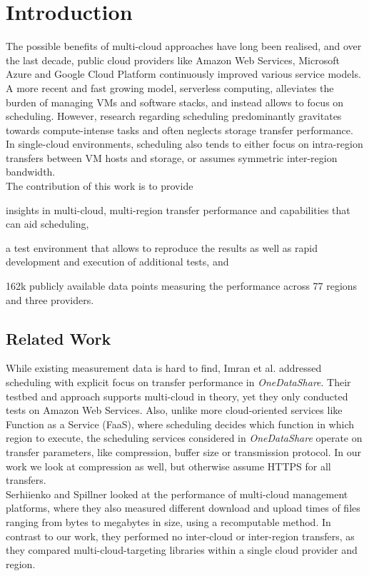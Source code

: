 \documentclass[a4paper,bibliography=totoc]{scrartcl}
\newcommand{\Azure}{Microsoft Azure\xspace}
\newcommand{\GCP}{Google Cloud Platform\xspace}
\newcommand{\AWS}{Amazon Web Services\xspace}
\begin{document}
\section{Introduction}
The possible benefits of multi-cloud approaches have long been realised,\cite{multi_cloud_expectations} and over the last decade, public cloud providers like \AWS, \Azure and \GCP continuously improved various service models.\cite{public_cloud_comparison} A more recent and fast growing model, serverless computing, alleviates the burden of managing VMs and software stacks, and instead allows to focus on scheduling.\cite{multi_cloud_serverless} However, research regarding scheduling predominantly gravitates towards compute-intense tasks and often neglects storage transfer performance.\cite{serverless_computing_and_scheduling,follow_data_not_function}\\
In single-cloud environments, scheduling also tends to either focus on intra-region transfers between VM hosts and storage,\cite{network_aware_vm_migration,content_based_scheduling_vm} or assumes symmetric inter-region bandwidth.\cite{twin_sibling_faas}\\
The contribution of this work is to provide
\begin{inparaenum}[(i)]
    \item insights in multi-cloud, multi-region transfer performance and capabilities that can aid scheduling,
    \item a test environment that allows to reproduce the results as well as rapid development and execution of additional tests, and
    \item 162k publicly available data points measuring the performance across 77 regions and three providers.
\end{inparaenum}

\subsection{Related Work}
While existing measurement data is hard to find, Imran et al. addressed scheduling with explicit focus on transfer performance in \textit{OneDataShare}.\cite{data_transfer_scheduling} Their testbed and approach supports multi-cloud in theory, yet they only conducted tests on \AWS. Also, unlike more cloud-oriented services like Function as a Service (FaaS), where scheduling decides which function in which region to execute,\cite{faas_introduction} the scheduling services considered in \textit{OneDataShare} operate on transfer parameters, like compression, buffer size or transmission protocol. In our work we look at compression as well, but otherwise assume HTTPS for all transfers.\\
Serhiienko and Spillner looked at the performance of multi-cloud management platforms,\cite{recomputable_comarison_multi_cloud_platforms} where they also measured different download and upload times of files ranging from bytes to megabytes in size, using a recomputable method. In contrast to our work, they performed no inter-cloud or inter-region transfers, as they compared multi-cloud-targeting libraries within a single cloud provider and region.
\end{document}
